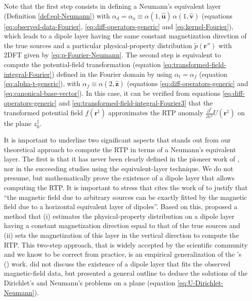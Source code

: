 Note that the first step consists in defining a Neumann's equivalent layer (Definition \ref{def:eql-Neumann}) with 
$\alpha_{d} = \alpha_{a} \equiv \alpha(1, \hat{\mathbf{u}}) \, \alpha(1, \hat{\mathbf{v}})$ (equations \ref{eq:observed-data-Fourier}, 
\ref{eq:diff-operators-generic} and \ref{eq:kernel-Fourier}), which leads to a dipole layer having the same constant 
magnetization direction of the true sources and a particular physical-property distribution 
$\tilde{p}(\mathbf{r}'')$ with 2DFT given by \ref{eq:p-Fourier-Neumann}. The second step is equivalent to  
compute the potential-field transformation (equation \ref{eq:transformed-field-integral-Fourier}) defined in the Fourier domain 
by using $\alpha_{t} = \alpha_{f}$ (equation \ref{eq:alpha-t-generic}), with 
$\alpha_{f} \equiv \alpha(2, \hat{\mathbf{z}})$ (equations \ref{eq:diff-operators-generic} and \ref{eq:canonical-base-vector}).
In this case, it can be verified from equations \ref{eq:diff-operators-generic} and \ref{eq:transformed-field-integral-Fourier3} that the 
transformed potential field $f(\mathbf{r}^{\ddagger})$ approximates the RTP anomaly $\tfrac{\partial^{2}}{\partial z^{2}} U(\mathbf{r}^{\ddagger})$ 
on the plane $z^{\ddagger}_{0}$.

It is important to underline two significant aspects that stands out from our theoretical approach to compute the RTP 
in terms of a Neumann's equivalent layer.
The first is that it has never been clearly defined in the pioneer work of \citet{silva1986}, nor in the succeeding studies 
\citep[e.g., ][]{leao-silva_1989, guspi_novara2009, oliveirajr_etal2013, li_etal2014, reis_etal2020, takahashi-etal2022} 
using the equivalent-layer technique. 
We do not presume, but mathematically prove the existence of a dipole layer that allows computing the RTP.
It is important to stress that \citet{silva1986} cites the work of \citet{roy1962} to justify that ``the magnetic 
field due to arbitrary sources can be exactly fitted by the magnetic field due to a horizontal equivalent
layer of dipoles''. 
Based on this, \citet{silva1986} proposed a method that (i) estimates the physical-property distribution on a dipole layer
having a constant magnetization direction equal to that of the true sources and (ii) sets the magnetization of this 
layer in the vertical direction to compute the RTP.
This two-step approach, that is widely accepted by the scientific community and we know to be correct from practice, is an empirical 
generalization of the \citeauthor{roy1962}'s (\citeyear{roy1962}) work.
\citeauthor{roy1962} did not discuss the existence of a dipole layer that fits the observed magnetic-field data,
but presented a general outline to deduce the solutions of the Dirichlet's and Neumann's problems on a plane 
(equation \ref{eq:U-Dirichlet-Neumann}).

